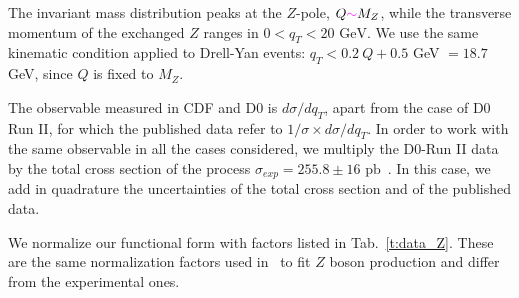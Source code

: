 \documentclass[aps,preprintnumbers,showpacs,nofootinbib,superscriptaddress,floatfix]{revtex4}
\newcommand{\AS}[1]{{\textcolor[rgb]{1,0,1}{#1}}}
\begin{document}
The invariant mass distribution peaks at the $Z$-pole, $Q \AS{\sim} M_Z$, while the transverse momentum of the exchanged $Z$ ranges in $0< q_T < 20 \text{ GeV}$.
We use the same kinematic condition applied to Drell-Yan events:  $q_T < 0.2\ Q + 0.5$ GeV $ = 18.7$ GeV, since $Q$ is fixed to $M_Z$. 

The observable measured in CDF and D0 is $d\sigma /dq_T$,  apart from the case of D0 Run II, for which the published data refer to $1/\sigma \times d\sigma/dq_T$. In order to work with the same observable in all the cases considered, we multiply the D0-Run II data by the total cross section of the process $\sigma_{exp} = 255.8 \pm 16 \text{ pb}$~\cite{Abulencia:2005ix}. In this case, we add in quadrature the uncertainties of the total cross section and of the published data. 

We normalize our functional form with factors listed in Tab.~\ref{t:data_Z}. These are the same normalization factors used in~\cite{DAlesio:2014mrz} to fit $Z$ boson production and differ from the experimental ones. 



\renewcommand{\tabcolsep}{0.4pc} %
\renewcommand{\arraystretch}{1.3} %
\end{document}
